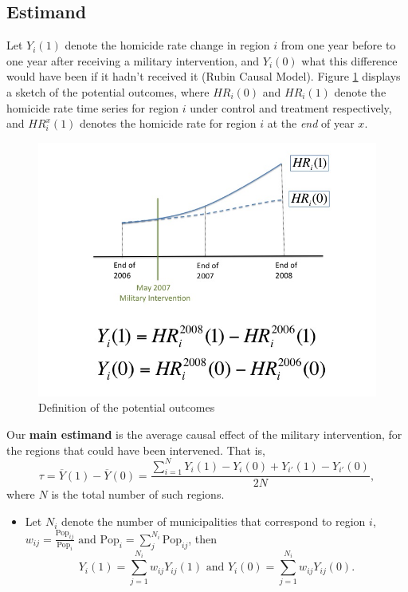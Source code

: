 \documentclass{article}[11 pt]
\begin{document}
\subsection{Estimand}

		        Let $Y_i(1)$ denote the homicide rate change in region $i$ from one year before to one year after receiving a military intervention, and $Y_i(0)$ what this difference would have been if it hadn't received it (Rubin Causal Model). Figure \ref{responseDef} displays a sketch of the potential outcomes, where $HR_i(0)$ and $HR_i(1)$ denote the homicide rate time series for region $i$ under control and treatment respectively, and $HR_i^{x}(1)$ denotes the homicide rate for region $i$ at the \emph{end} of year $x$.
		
		
				\begin{figure}[htdp]
					\centering
				      \includegraphics[scale=0.3]{Images/ResponseDef/Slide1.jpg}
				      \caption{Definition of the potential outcomes}
				\label{responseDef}
				\end{figure}
		  		Our \textbf{ main estimand} is the average causal effect of the military intervention, for the regions that could have been intervened. That is, $$\tau=\overline{Y}(1)-\overline{Y}(0)=\frac{ \sum_{i=1}^{N} Y_i(1)-Y_i(0)+ Y_{i'}(1)-Y_{i'}(0)}{2N},$$ where $N$ is the total number of such regions.
				\begin{itemize}
					   \item Let $N_i$ denote the number of municipalities that correspond to region $i$, $w_{ij}= \frac{\textrm{Pop}_{ij}}{\textrm{Pop}_{i}} \textrm{ and  }\textrm{Pop}_{i}= \sum_j^{N_i}\textrm{Pop}_{ij}$, then 
						$$Y_i(1) = \sum_{j=1}^{N_i}w_{ij}Y_{ij}(1) \textrm{ and } Y_i(0) = \sum_{j=1}^{N_i}w_{ij}Y_{ij}(0).$$						
				\end{itemize}
\end{document}
